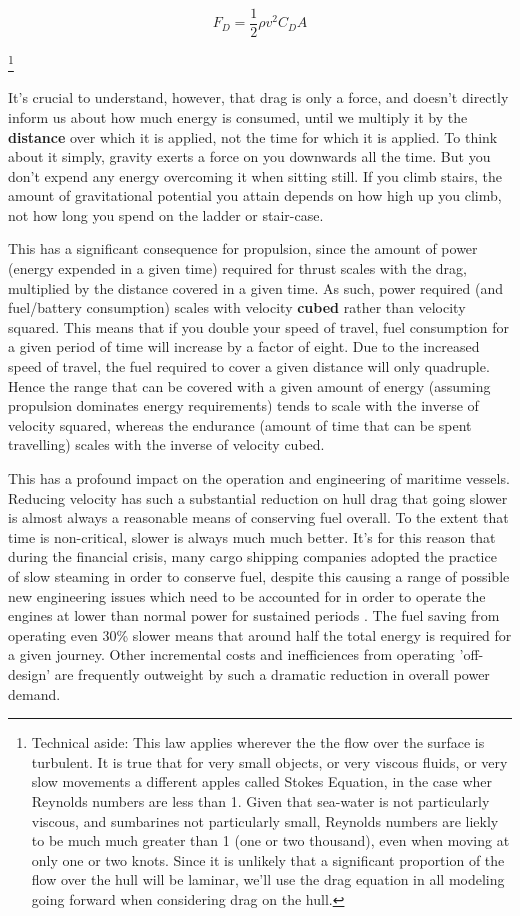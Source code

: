 \documentclass{article}\usepackage[]{graphicx}\usepackage[]{color}
\begin{document}
\begin{equation}
\label{eq:1}
F_D = \frac{1}{2}\rho v^2C_DA
\end{equation}

\footnote{Technical aside: This law applies wherever the the flow over the surface is turbulent. It is true that for very small objects, or very viscous fluids, or very slow movements a different apples called Stokes Equation, in the case wher Reynolds numbers are less than 1.  Given that sea-water is not particularly viscous, and sumbarines not particularly small, Reynolds numbers are liekly to be much much greater than 1 (one or two thousand), even when moving at only one or two knots.  Since it is unlikely that a significant proportion of the flow over the hull will be laminar, we'll use the drag equation in all modeling going forward when considering drag on the hull.}

It's crucial to understand, however, that drag is only a force, and doesn't directly inform us about how much energy is consumed, until we multiply it by the \textbf{distance} over which it is applied, not the time for which it is applied.  To think about it simply, gravity exerts a force on you downwards all the time.  But you don't expend any energy overcoming it when sitting still.  If you climb stairs, the amount of gravitational potential you attain depends on how high up you climb, not how long you spend on the ladder or stair-case.

This has a significant consequence for propulsion, since the amount of power (energy expended in a given time) required for thrust scales with the drag, multiplied by the distance covered in a given time.  As such, power required (and fuel/battery consumption) scales with velocity \textbf{cubed} rather than velocity squared.  This means that if you double your speed of travel, fuel consumption for a given period of time will increase by a factor of eight.  Due to the increased speed of travel, the fuel required to cover a given distance will only quadruple.  Hence the range that can be covered with a given amount of energy (assuming propulsion dominates energy requirements) tends to scale with the inverse of velocity squared, whereas the endurance (amount of time that can be spent travelling) scales with the inverse of velocity cubed.

This has a profound impact on the operation and engineering of maritime vessels.  Reducing velocity has such a substantial reduction on hull drag that going slower is almost always a reasonable means of conserving fuel overall.  To the extent that time is non-critical, slower is always much much better.  It's for this reason that during the financial crisis, many cargo shipping companies adopted the practice of slow steaming \parencite{liang2014} in order to conserve fuel, despite this causing a range of possible new engineering issues which need to be accounted for in order to operate the engines at lower than normal power for sustained periods \parencite[8-10]{sanguri2012}. The fuel saving from operating even 30\% slower means that around half the total energy is required for a given journey.  Other incremental costs and inefficiences from operating 'off-design' are frequently outweight by such a dramatic reduction in overall power demand.
\end{document}
